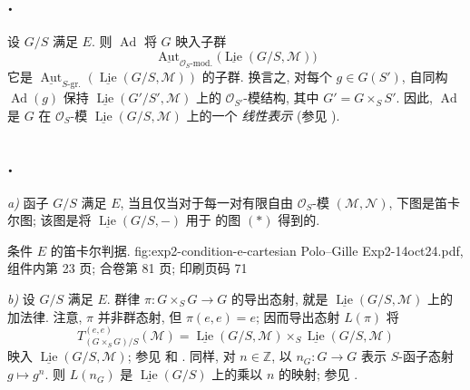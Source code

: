 \subsection*{.}
设 \(G/S\) 满足 \(E\). 则 \(\operatorname{Ad}\) 将 \(G\) 映入子群
\[
  \underline{\operatorname{Aut}}_{\mathcal O_S\text{-mod.}}
    \bigl(\underline{\operatorname{Lie}}(G/S,\mathcal M)\bigr)
\]
它是 \(\underline{\operatorname{Aut}}_{S\text{-gr.}}
(\underline{\operatorname{Lie}}(G/S,\mathcal M))\) 的子群. 换言之, 对每个 \(g\in G(S')\), 自同构 \(\operatorname{Ad}(g)\) 保持
\(\underline{\operatorname{Lie}}(G'/S',\mathcal M)\) 上的
\(\mathcal O_{S'}\)-模结构, 其中 \(G'=G\times_SS'\).
因此, \(\operatorname{Ad}\) 是 \(G\) 在 \(\mathcal O_S\)-模
\(\underline{\operatorname{Lie}}(G/S,\mathcal M)\) 上的一个
\emph{线性表示} (参见 ).

\subsection*{.}
\textit{a)} 函子 \(G/S\) 满足 \(E\), 当且仅当对于每一对有限自由
\(\mathcal O_S\)-模 \((\mathcal M,\mathcal N)\), 下图是笛卡尔图;
该图是将 \(\underline{\operatorname{Lie}}(G/S,-)\) 用于
 的图 \((*)\) 得到的.

  {条件 \(E\) 的笛卡尔判据.}
  {fig:exp2-condition-e-cartesian}
  {Polo--Gille Exp2-14oct24.pdf, 组件内第 23 页; 合卷第 81 页; 印刷页码 71}

\textit{b)} 设 \(G/S\) 满足 \(E\). 群律 \(\pi:G\times_SG\to G\) 的导出态射,
就是 \(\underline{\operatorname{Lie}}(G/S,\mathcal M)\) 上的加法律.
注意, \(\pi\) 并非群态射, 但 \(\pi(e,e)=e\); 因而导出态射 \(L(\pi)\) 将
\[
  T^{(e,e)}_{(G\times_SG)/S}(\mathcal M)
  =\underline{\operatorname{Lie}}(G/S,\mathcal M)
   \times_S\underline{\operatorname{Lie}}(G/S,\mathcal M)
\]
映入 \(\underline{\operatorname{Lie}}(G/S,\mathcal M)\);
参见  和
. 同样, 对 \(n\in\mathbb Z\),
以 \(n_G:G\to G\) 表示 \(S\)-函子态射 \(g\mapsto g^n\).
则 \(L(n_G)\) 是 \(\underline{\operatorname{Lie}}(G/S)\) 上的乘以 \(n\) 的映射;
参见 .

